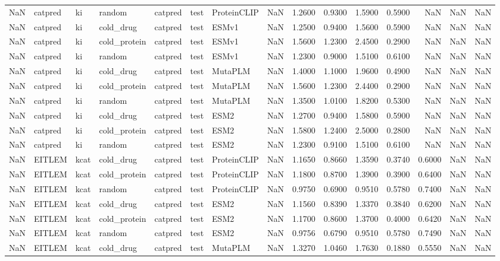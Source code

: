 \begin{tabular}{rlllllllrrrrrrr}
NaN & catpred & ki & random & catpred & test & ProteinCLIP & NaN & 1.2600 & 0.9300 & 1.5900 & 0.5900 & NaN & NaN & NaN \\
NaN & catpred & ki & cold_drug & catpred & test & ESMv1 & NaN & 1.2500 & 0.9400 & 1.5600 & 0.5900 & NaN & NaN & NaN \\
NaN & catpred & ki & cold_protein & catpred & test & ESMv1 & NaN & 1.5600 & 1.2300 & 2.4500 & 0.2900 & NaN & NaN & NaN \\
NaN & catpred & ki & random & catpred & test & ESMv1 & NaN & 1.2300 & 0.9000 & 1.5100 & 0.6100 & NaN & NaN & NaN \\
NaN & catpred & ki & cold_drug & catpred & test & MutaPLM & NaN & 1.4000 & 1.1000 & 1.9600 & 0.4900 & NaN & NaN & NaN \\
NaN & catpred & ki & cold_protein & catpred & test & MutaPLM & NaN & 1.5600 & 1.2300 & 2.4400 & 0.2900 & NaN & NaN & NaN \\
NaN & catpred & ki & random & catpred & test & MutaPLM & NaN & 1.3500 & 1.0100 & 1.8200 & 0.5300 & NaN & NaN & NaN \\
NaN & catpred & ki & cold_drug & catpred & test & ESM2 & NaN & 1.2700 & 0.9400 & 1.5800 & 0.5900 & NaN & NaN & NaN \\
NaN & catpred & ki & cold_protein & catpred & test & ESM2 & NaN & 1.5800 & 1.2400 & 2.5000 & 0.2800 & NaN & NaN & NaN \\
NaN & catpred & ki & random & catpred & test & ESM2 & NaN & 1.2300 & 0.9100 & 1.5100 & 0.6100 & NaN & NaN & NaN \\
NaN & EITLEM & kcat & cold_drug & catpred & test & ProteinCLIP & NaN & 1.1650 & 0.8660 & 1.3590 & 0.3740 & 0.6000 & NaN & NaN \\
NaN & EITLEM & kcat & cold_protein & catpred & test & ProteinCLIP & NaN & 1.1800 & 0.8700 & 1.3900 & 0.3900 & 0.6400 & NaN & NaN \\
NaN & EITLEM & kcat & random & catpred & test & ProteinCLIP & NaN & 0.9750 & 0.6900 & 0.9510 & 0.5780 & 0.7400 & NaN & NaN \\
NaN & EITLEM & kcat & cold_drug & catpred & test & ESM2 & NaN & 1.1560 & 0.8390 & 1.3370 & 0.3840 & 0.6200 & NaN & NaN \\
NaN & EITLEM & kcat & cold_protein & catpred & test & ESM2 & NaN & 1.1700 & 0.8600 & 1.3700 & 0.4000 & 0.6420 & NaN & NaN \\
NaN & EITLEM & kcat & random & catpred & test & ESM2 & NaN & 0.9756 & 0.6790 & 0.9510 & 0.5780 & 0.7490 & NaN & NaN \\
NaN & EITLEM & kcat & cold_drug & catpred & test & MutaPLM & NaN & 1.3270 & 1.0460 & 1.7630 & 0.1880 & 0.5550 & NaN & NaN \\

\end{tabular}
